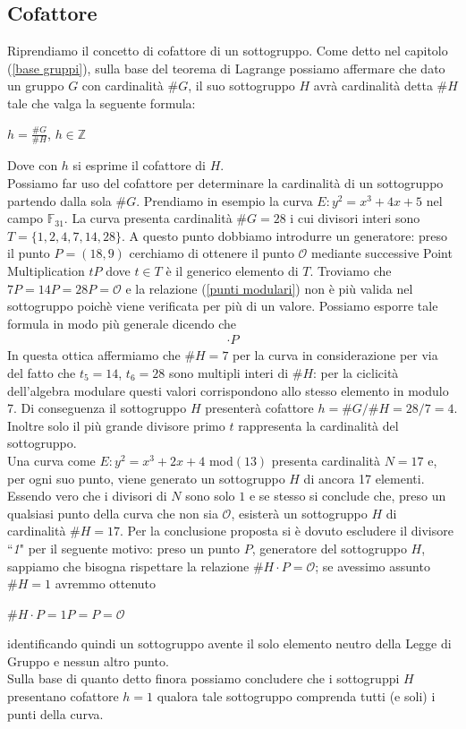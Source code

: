 \documentclass[a4paper,12pt]{tesiinfo}
\newcommand\ddfrac[2]{\frac{\displaystyle #1}{\displaystyle #2}}
\begin{document}
\subsection{Cofattore}
Riprendiamo il concetto di cofattore di un sottogruppo. Come detto nel capitolo (\ref{base gruppi}), sulla base del teorema di Lagrange possiamo affermare che dato un gruppo $G$ con cardinalit\`a $\#G$, il suo sottogruppo $H$ avr\`a cardinalit\`a detta $\#H$ tale che valga la seguente formula:
\begin{center}
 $h = \ddfrac{\#G}{\#H}$, $h \in \mathbb{Z}$
\end{center}
Dove con $h$ si esprime il cofattore di $H$.
\\
Possiamo far uso del cofattore per determinare la cardinalit\`a di un sottogruppo partendo dalla sola $\#G$. Prendiamo in esempio la curva $E : y^2 = x^3+4x+5$ nel campo $\mathbb{F}_{31}$. La curva presenta cardinalit\`a $\#G=28$ i cui divisori interi sono $T = \{1, 2, 4, 7, 14, 28\}$. A questo punto dobbiamo introdurre un generatore: preso il punto $P=(18, 9)$ cerchiamo di ottenere il punto $\mathcal{O}$ mediante successive Point Multiplication $tP$ dove $t \in T$ \`e il generico elemento di $T$. Troviamo che $7P = 14P=28P= \mathcal{O}$ e la relazione (\ref{punti modulari}) non \`e pi\`u valida nel sottogruppo poich\`e viene verificata per pi\`u di un valore. Possiamo esporre tale formula in modo pi\`u generale dicendo che \begin{gather}
[k \text{ mod} (\#H)] \cdot P
\end{gather}
In questa ottica affermiamo che $\#H=7$ per la curva in considerazione per via del fatto che $t_5=14$, $t_6=28$ sono multipli interi di $\#H$: per la ciclicit\`a dell'algebra modulare questi valori corrispondono allo stesso elemento in modulo 7. Di conseguenza il sottogruppo $H$ presenter\`a cofattore $h = \#G/\#H=28/7 = 4$. 
\\
Inoltre solo il pi\`u grande divisore primo $t$ rappresenta la cardinalit\`a del sottogruppo.
\\
Una curva come $E: y^2 = x^3 +2x+4$ mod$(13)$ presenta cardinalit\`a $N=17$ e, per ogni suo punto, viene generato un sottogruppo $H$ di ancora 17 elementi. Essendo vero che i divisori di $N$ sono solo $1$ e se stesso si conclude che, preso un qualsiasi punto della curva che non sia $\mathcal{O}$, esister\`a un sottogruppo $H$ di cardinalit\`a $\#H = 17$. Per la conclusione proposta si \`e dovuto escludere il divisore ``\emph{1}" per il seguente motivo: preso un punto $P$, generatore del sottogruppo $H$, sappiamo che bisogna rispettare la relazione $\#H \cdot P = \mathcal{O}$; se avessimo assunto $\#H = 1$ avremmo ottenuto
\begin{center}
 $\#H \cdot P = 1P = P = \mathcal{O}$
\end{center}
identificando quindi un sottogruppo avente il solo elemento neutro della Legge di Gruppo e nessun altro punto.
\\
Sulla base di quanto detto finora possiamo concludere che i sottogruppi $H$ presentano cofattore $h=1$ qualora tale sottogruppo comprenda tutti (e soli) i punti della curva.
\end{document}
